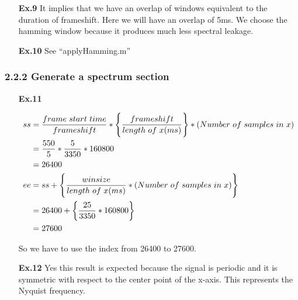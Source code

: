 \documentclass[a4paper]{article}
\begin{document}
\begin{enumerate}
\item[\textbf{Ex.9}]
It implies that we have an overlap of windows equivalent to the duration of frameshift. Here we will have an overlap of 5ms. We choose the hamming window because it produces much less spectral leakage.

\item[\textbf{Ex.10}] See ``applyHamming.m''

\end{enumerate}

\subsubsection*{2.2.2 Generate a spectrum section}
\begin{enumerate}
	\item[\textbf{Ex.11}]
	
	\begin{align*}
	ss &= \frac{frame\hspace{3pt}start\hspace{3pt}time}{frameshift} * \Bigg\{	\frac{frameshift}{length\hspace{3pt}of\hspace{3pt}x (ms)} \Bigg\} * (Number\hspace{3pt} of\hspace{3pt} samples\hspace{3pt} in\hspace{3pt} x) \\
	&= \frac{550}{5} * \frac{5}{3350} * 160800 \\
	&= 26400 \\
    \newline
	ee &= ss + \Bigg\{ \frac{winsize}{length\hspace{3pt}of\hspace{3pt}x (ms)} * (Number\hspace{3pt} of\hspace{3pt} samples\hspace{3pt} in\hspace{3pt} x) \Bigg\} \\
	&= 26400 + \bigg\{ \frac{25}{3350} * 160800 \bigg\} \\
	&= 27600
	\end{align*}
	
	So we have to use the index from 26400 to 27600.

	\item[\textbf{Ex.12}] Yes this result is expected because the signal is periodic and it is symmetric with respect to the center point of the x-axis. This represents the Nyquist frequency.
	

\end{enumerate}
\end{document}
